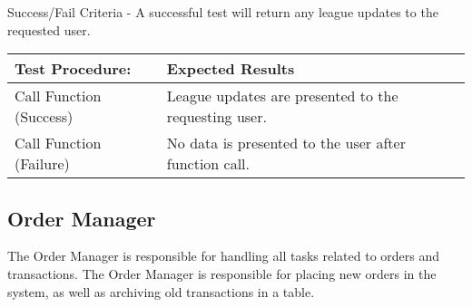\begin{enumerate}
    Success/Fail Criteria - A successful test will return any league updates
    to the requested user.\\

    \begin{longtable}{|p{2in}|p{4.5in}|}
    \hline
    {\large \color{color1}Test Procedure:}&{\large \color{color1}Expected Results}\\ \hline
    Call Function (Success) & League updates are presented to the requesting
    user. \\ \hline
    Call Function (Failure) & No data is presented to the user after function
    call. \\ \hline
    \end{longtable}
    \vspace{5mm}

  \end{enumerate}

\subsection{Order Manager}

The Order Manager is responsible for handling all tasks related to orders and
transactions.  The Order Manager is responsible for placing new orders in the
system, as well as archiving old transactions in a table.\\

